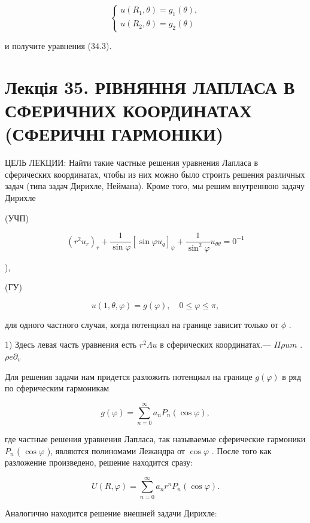 \documentclass[
  ukrainian,
]{article}
\begin{document}
\[
\begin{cases} u(R_1, \theta) = g_1(\theta), \\ u(R_2, \theta) = g_2(\theta) \end{cases}
\]

и получите уравнения (34.3).

\section{Лекція 35. РІВНЯННЯ ЛАПЛАСА В СФЕРИЧНИХ КООРДИНАТАХ (СФЕРИЧНІ
ГАРМОНІКИ)}\label{ux43bux435ux43aux446ux456ux44f-35.-ux440ux456ux432ux43dux44fux43dux43dux44f-ux43bux430ux43fux43bux430ux441ux430-ux432-ux441ux444ux435ux440ux438ux447ux43dux438ux445-ux43aux43eux43eux440ux434ux438ux43dux430ux442ux430ux445-ux441ux444ux435ux440ux438ux447ux43dux456-ux433ux430ux440ux43cux43eux43dux456ux43aux438}

ЦЕЛЬ ЛЕКЦИИ: Найти такие частные решения уравнения Лапласа в сферических
координатах, чтобы из них можно было строить решения различных задач
(типа задач Дирихле, Неймана). Кроме того, мы решим внутреннюю задачу
Дирихле

(УЧП)

\[
(r^2u_r)_r + \frac{1}{\sin\varphi} \left[\sin\varphi u_q\right]_{\varphi} + \frac{1}{\sin^2\varphi} u_{\theta\theta} = 0^{-1}
\]

),

(ГУ)

\[
u(1, \theta, \varphi) = g(\varphi), \quad 0 \le \varphi \le \pi,
\]

для одного частного случая, когда потенциал на границе зависит только от
\(\phi\) .

1) Здесь левая часть уравнения есть \(r^2 \Lambda u\) в сферических
координатах.--- \(\Pi \rho u m\) . \(\rho e \partial_v\)

Для решения задачи нам придется разложить потенциал на границе
\(g(\varphi)\) в ряд по сферическим гармоникам

\[
g(\varphi) = \sum_{n=0}^{\infty} a_n P_n(\cos \varphi),
\]

где частные решения уравнения Лапласа, так называемые сферические
гармоники \(P_n\) ( \(\cos \varphi\) ), являются полиномами Лежандра от
\(\cos \varphi\) . После того как разложение произведено, решение
находится сразу:

\[
U(R, \varphi) = \sum_{n=0}^{\infty} a_n r^n P_n(\cos \varphi).
\]

Аналогично находится решение внешней задачи Дирихле:
\end{document}
